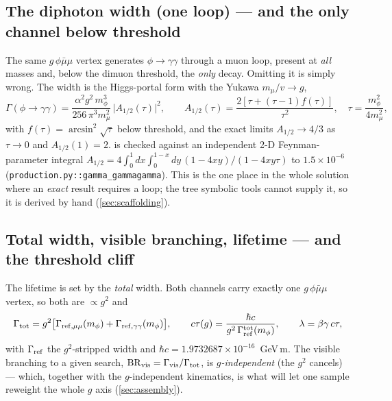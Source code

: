 \documentclass[11pt]{article}
\newcommand{\mphi}{m_\phi}
\begin{document}
\subsection{The diphoton width (one loop) --- and the only channel below threshold}
\label{sec:decay:gg}

The same $g\,\phi\bar\mu\mu$ vertex generates $\phi\to\gamma\gamma$ through a
muon loop, present at \emph{all} masses and, below the dimuon threshold, the
\emph{only} decay. Omitting it is simply wrong. The width is the Higgs-portal
form with the Yukawa $m_\mu/v\to g$,
\begin{equation}
\Gamma(\phi\to\gamma\gamma)=\frac{\alpha^2 g^2\,\mphi^3}{256\,\pi^3 m_\mu^2}
\,\big|A_{1/2}(\tau)\big|^2,\qquad
A_{1/2}(\tau)=\frac{2[\tau+(\tau-1)f(\tau)]}{\tau^2},\quad
\tau=\frac{\mphi^2}{4m_\mu^2},
\label{eq:gammagg}
\end{equation}
with $f(\tau)=\arcsin^2\!\sqrt\tau$ below threshold, and the exact limits
$A_{1/2}\to4/3$ as $\tau\to0$ and $A_{1/2}(1)=2$.  is checked
against an independent 2-D Feynman-parameter integral
$A_{1/2}=4\!\int_0^1\!dx\!\int_0^{1-x}\!dy\,(1-4xy)/(1-4xy\tau)$ to
$1.5\times10^{-6}$ (\texttt{production.py::gamma\_gammagamma}). This is the one
place in the whole solution where an \emph{exact} result requires a loop; the
tree symbolic tools cannot supply it, so it is derived by hand
(\cref{sec:scaffolding}).

\subsection{Total width, visible branching, lifetime --- and the threshold cliff}
\label{sec:decay:total}

The lifetime is set by the \emph{total} width. Both channels carry exactly one
$g\,\phi\bar\mu\mu$ vertex, so both are $\propto g^2$ and
\begin{equation}
\Gamma_{\rm tot}=g^2\big[\Gamma_{\rm ref,\mu\mu}(\mphi)+\Gamma_{\rm ref,\gamma\gamma}(\mphi)\big],
\qquad
c\tau(g)=\frac{\hbar c}{g^2\,\Gamma_{\rm ref}^{\rm tot}(\mphi)},
\qquad \lambda=\beta\gamma\,c\tau ,
\label{eq:ctau}
\end{equation}
with $\Gamma_{\rm ref}$ the $g^2$-stripped width and $\hbar c=1.9732687\times
10^{-16}$~GeV\,m. The visible branching to a given search,
$\mathrm{BR}_{\rm vis}=\Gamma_{\rm vis}/\Gamma_{\rm tot}$, is
\emph{$g$-independent} (the $g^2$ cancels) --- which, together with the
$g$-independent kinematics, is what will let one sample reweight the whole $g$
axis (\cref{sec:assembly}).
\end{document}
